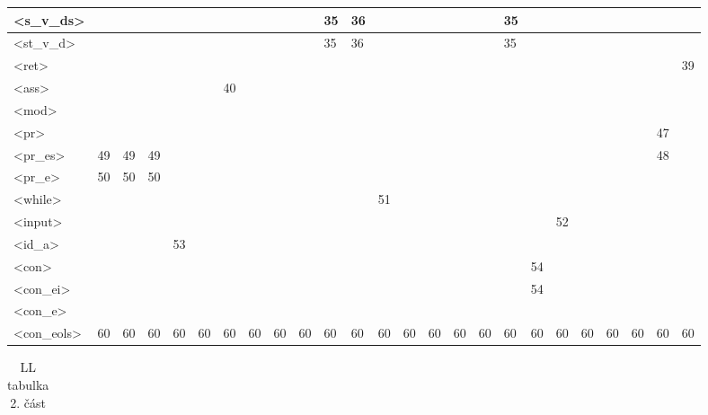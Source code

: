 \begin{normalsize}
\begin{enumerate}
\begin{landscape}
\begin{table}[htbp]
\begin{tabular}{|l|l|l|l|l|l|l|l|l|l|l|l|l|l|l|l|l|l|l|l|l|l|l|l|l|}
                    \\ \hline
                    <s\_v\_ds>&&&&&&&&&&35&36&&&&&&35&&&&&&&
                    \\ \hline
                    <st\_v\_d>&&&&&&&&&&35&36&&&&&&35&&&&&&&
                    \\ \hline
                    <ret>&&&&&&&&&&&&&&&&&&&&&&&&39
                    \\ \hline
                    <ass>&&&&&&40&&&&&&&&&&&&&&&&&&
                    \\ \hline
                    <mod>&&&&&&&&&&&&&&&&&&&&&&&&
                    \\ \hline
                    <pr>&&&&&&&&&&&&&&&&&&&&&&&47&
                    \\ \hline
                    <pr\_es>&49&49&49&&&&&&&&&&&&&&&&&&&&48&
                    \\ \hline
                    <pr\_e>&50&50&50&&&&&&&&&&&&&&&&&&&&&
                    \\ \hline
                    <while>&&&&&&&&&&&&51&&&&&&&&&&&&
                    \\ \hline
                    <input>&&&&&&&&&&&&&&&&&&&52&&&&&
                    \\ \hline
                    <id\_a>&&&&53&&&&&&&&&&&&&&&&&&&&
                    \\ \hline
                    <con>&&&&&&&&&&&&&&&&&&54&&&&&&
                    \\ \hline
                    <con\_ei>&&&&&&&&&&&&&&&&&&54&&&&&&
                    \\ \hline
                    <con\_e>&&&&&&&&&&&&&&&&&&&&&&&&
                    \\ \hline
                    <con\_eols>&60&60&60&60&60&60&60&60&60&60&60&60&60&60&60&60&60&60&60&60&60&60&60&60
                    \\ \hline
                \end{tabular}
            \end{table}
        \end{landscape}
        \newpage
        \begin{landscape}
            \begin{table}[htbp]
                \label{table:prec2}
                \centering
                \caption{LL tabulka 2. část}
                \begin{tabular}{|l|l|l|l|l|l|l|l|l|l|l|l|l|l|l|l|l|l|l|l|l|l|l|l|l|l|l|l|l|l|}
                    \hline



\end{tabular}
\end{table}
\end{landscape}
\end{enumerate}
\end{normalsize}

